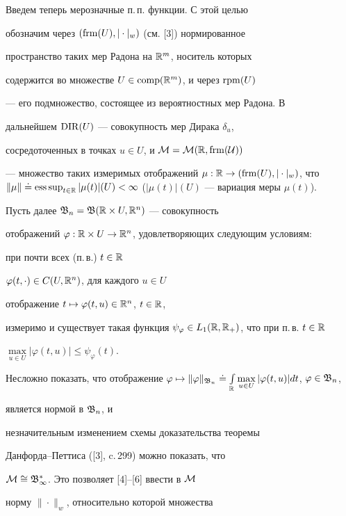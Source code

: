 Введем теперь мерозначные п.\,п. функции. С этой целью


обозначим через $(\operatorname{frm} (U),|\cdot |_{w})$ (см. [3]) нормированное


пространство таких мер Радона на $\Bbb R^m$, носитель которых


содержится во множестве $U\in \operatorname{comp} (\Bbb R^m)$, и через $\operatorname{rpm} (U)$


--- его подмножество, состоящее из вероятностных мер Радона. В


дальнейшем $\operatorname{DIR} (U)$ --- совокупность мер Дирака $\delta_u$,


сосредоточенных в точках $u\in U$, и $\cal M=\cal M(\Bbb R,\operatorname{frm}(U))$


--- множество таких измеримых отображений $\mu: \Bbb R\to (\frm


(U), |\cdot |_w)$, что $\|\mu\|\doteq\esssup\limits_{t\in \Bbb R}


|\mu(t)|(U)<\infty$ ($|\mu(t)|(U)$ --- вариация меры $\mu(t)$).


Пусть далее $\frak B_n=\frak B(\Bbb R\times U,\Bbb R^n)$ --- совокупность


отображений $\varphi:\Bbb R\times U\to


\Bbb R^n$, удовлетворяющих следующим условиям:


при почти всех (п.\,в.) $t\in\Bbb R$\;


$\varphi (t,\cdot)\in C(U,\Bbb R^n)$, для каждого $u\in U$


отображение $t\mapsto \varphi(t,u)\in \Bbb R^n$, $t\in \Bbb R$,


измеримо и существует такая функция $\psi_{\varphi}\in L_1


(\Bbb R,\Bbb R_+)$, что при п.\,в. $t\in \Bbb R$\;


$\max\limits_{u\in U}|\varphi (t,u)|\le \psi_{\varphi}(t)$.


Несложно показать, что отображение $\varphi\mapsto


\|\varphi\|_{\frak B_n}\doteq \int\limits_{\Bbb R}\max\limits_{u\in


U}|\varphi(t,u)|dt$, $\varphi \in \frak B_n$,


является нормой в $\frak B_n$, и


незначительным изменением схемы доказательства теоремы


Данфорда--Петтиса ([3], c.\,299) можно показать, что


$\cal M\cong\frak B_1^*$. Это позволяет [4]--[6] ввести в $\cal M$


норму $\|\cdot\|_w$, относительно которой множества


